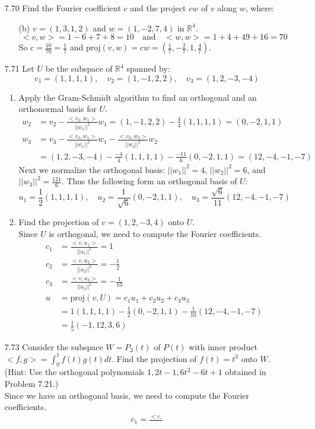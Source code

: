 \documentclass[12pt]{article}
\theoremstyle{definition}
\theoremstyle{plain}
\begin{document}
\begin{enumerate}
\item[7.70]Find the Fourier coefficient $c$ and the project $cw$ of $v$ along $w$, where:
	\begin{enumerate}
	\item[(b)] $v=(1,3,1,2)$ and $w=(1,-2,7,4)$ in $\mathbb{R}^4$.
		\[ <v,w>=1-6+7+8=10 \quad \mathrm{and} \quad <w,w>=1+4+49+16=70 \]
		So $c=\frac{10}{70}=\frac{1}{7}$ and $\mathrm{proj}(v,w)=cw=(\frac{1}{7},-\frac{2}{7},1,\frac{4}{7})$.
	\end{enumerate}

\item[7.71]Let $U$ be the subspace of $\mathbb{R}^4$ spanned by:
\[ v_1=(1,1,1,1), \quad v_2=(1,-1,2,2), \quad v_3=(1,2,-3,-4) \]
	\begin{enumerate}
	\item Apply the Gram-Schmidt algorithm to find an orthogonal and an orthonormal basis for $U$.
		\begin{align*}
		w_2&=v_2-\frac{<v_2,w_1>}{||w_1||^2}w_1 = (1,-1,2,2)-\frac{4}{4}(1,1,1,1) = (0,-2,1,1)\\
		w_3&=v_3-\frac{<v_3,w_1>}{||w_1||^2}w_1-\frac{<v_3,w_2>}{||w_2||^2}w_2\\
		&= (1,2,-3,-4)-\frac{-4}{4}(1,1,1,1)-\frac{-11}{6}(0,-2,1,1) = (12,-4,-1,-7)
		\end{align*}
		Next we normalize the orthogonal basis: $||w_1||^2 = 4$, $||w_2||^2=6$, and $||w_3||^2=\frac{121}{6}$. Thus the following form an orthogonal basis of $U$:
		\[ u_1=\frac{1}{2}(1,1,1,1), \quad u_2=\frac{1}{\sqrt{6}}(0,-2,1,1), \quad u_3 = \frac{\sqrt{6}}{11}(12,-4,-1,-7) \]
	\item Find the projection of $v=(1,2,-3,4)$ onto $U$.\\
	Since $U$ is orthogonal, we need to compute the Fourier coefficients.
	\begin{align*}
	c_1 &= \frac{<v,u_1>}{||u_1||^2} = 1\\
	c_2 &= \frac{<v,u_2>}{||u_2||^2} = -\frac{1}{2}\\
	c_3 &= \frac{<v,u_3>}{||u_3||^2} = -\frac{1}{10}\\
	u&=\mathrm{proj}(v,U)=c_1u_1+c_2u_2+c_3u_3\\
	&= 1(1,1,1,1)-\frac{1}{2}(0,-2,1,1)-\frac{1}{10}(12,-4,-1,-7)\\
	&= \frac{1}{5}(-1,12,3,6)
	\end{align*}
	\end{enumerate}

\item[7.73]Consider the subspace $W=P_2(t)$ of $P(t)$ with inner product $<f,g>=\int_0^1f(t)g(t)dt$. Find the projection of $f(t)=t^3$ onto $W$. (Hint: Use the orthogonal polynomials $1,2t-1,6t^2-6t+1$ obtained in Problem 7.21.)\\
	Since we have an orthogonal basis, we need to compute the Fourier coefficients.
	\begin{align*}
	c_1=\frac{<v,}{}
	\end{align*}


\end{enumerate}
\end{document}
